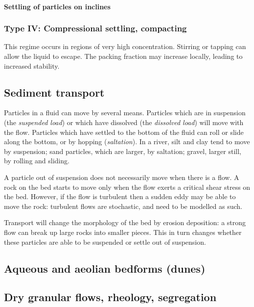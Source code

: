 \paragraph{Settling of particles on inclines}

\subsubsection{Type IV: Compressional settling, compacting}

This regime occurs in regions of very high concentration. Stirring or tapping can allow the liquid to escape. The packing fraction may increase locally, leading to increased stability.  

\subsection{Sediment transport}

Particles in a fluid can move by several means. Particles which are in suspension (the \textit{suspended load}) or which have dissolved (the \textit{dissolved load}) will move with the flow. Particles which have settled to the bottom of the fluid can roll or slide along the bottom, or by hopping (\textit{saltation}). In a river, silt and clay tend to move by suspension; sand particles, which are larger, by saltation; gravel, larger still, by rolling and sliding. 

A particle out of suspension does not necessarily move when there is a flow. A rock on the bed starts to move only when the flow exerts a critical shear stress on the bed. However, if the flow is turbulent then a sudden eddy may be able to move the rock: turbulent flows are stochastic, and need to be modelled as such. 

Transport will change the morphology of the bed by erosion deposition: a strong flow can break up large rocks into smaller pieces. This in turn changes whether these particles are able to be suspended or settle out of suspension.  

\subsection{Aqueous and aeolian bedforms (dunes)}

\subsection{Dry granular flows, rheology, segregation}

